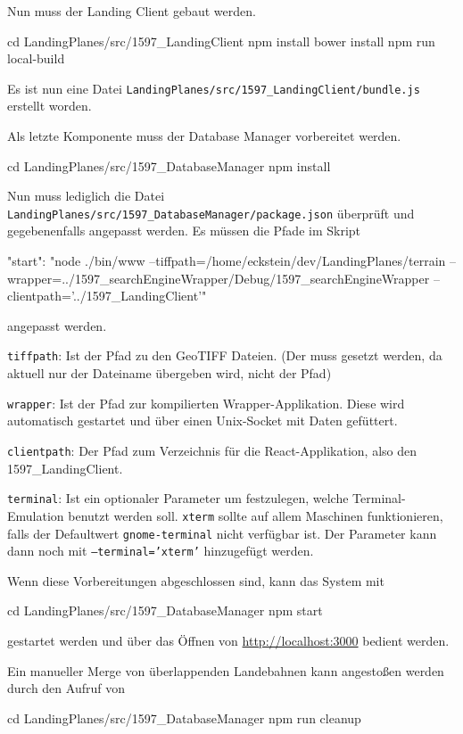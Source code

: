 \documentclass[10pt,a4paper]{report}
\newcommand*{\skippingparagraph}{\par\vspace{1.0\baselineskip}\noindent}
\begin{document}
\skippingparagraph
Nun muss der Landing Client gebaut werden.
\begin{verbatim*}
cd LandingPlanes/src/1597_LandingClient
npm install
bower install
npm run local-build
\end{verbatim*}

Es ist nun eine Datei \texttt{LandingPlanes/src/1597\_LandingClient/bundle.js} erstellt worden.

\skippingparagraph
Als letzte Komponente muss der Database Manager vorbereitet werden.
\begin{verbatim*}
cd LandingPlanes/src/1597_DatabaseManager
npm install
\end{verbatim*}

\skippingparagraph
Nun muss lediglich die Datei \texttt{LandingPlanes/src/1597\_DatabaseManager/package.json} überprüft und gegebenenfalls angepasst werden. Es müssen die Pfade im Skript 
\begin{verbatim*}
"start": "node ./bin/www --tiffpath=/home/eckstein/dev/LandingPlanes/terrain
         --wrapper=../1597_searchEngineWrapper/Debug/1597_searchEngineWrapper 
         --clientpath='../1597_LandingClient'"
\end{verbatim*}
angepasst werden.

\texttt{tiffpath}: Ist der Pfad zu den GeoTIFF Dateien. (Der muss gesetzt werden, da aktuell nur der Dateiname übergeben wird, nicht der Pfad)

\texttt{wrapper}: Ist der Pfad zur kompilierten Wrapper-Applikation. Diese wird automatisch gestartet und über einen Unix-Socket mit Daten gefüttert. 

\texttt{clientpath}: Der Pfad zum Verzeichnis für die React-Applikation, also den 1597\_LandingClient.

\texttt{terminal}: Ist ein optionaler Parameter um festzulegen, welche Terminal-Emulation benutzt werden soll. \texttt{xterm} sollte auf allem Maschinen funktionieren, falls der Defaultwert \texttt{gnome-terminal} nicht verfügbar ist. Der Parameter kann dann noch mit \texttt{--terminal='xterm'} hinzugefügt werden.

\skippingparagraph
Wenn diese Vorbereitungen abgeschlossen sind, kann das System mit
\begin{verbatim*}
cd LandingPlanes/src/1597_DatabaseManager
npm start
\end{verbatim*}

gestartet werden und über das Öffnen von \href{http://localhost:3000}{http://localhost:3000} bedient werden.


\skippingparagraph
Ein manueller Merge von überlappenden Landebahnen kann angestoßen werden durch den Aufruf von 
\begin{verbatim*}
cd LandingPlanes/src/1597_DatabaseManager
npm run cleanup
\end{verbatim*}
\end{document}
